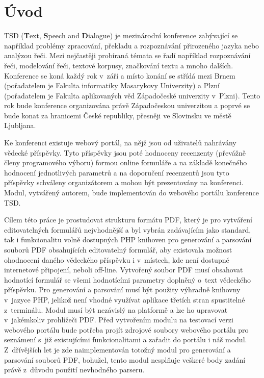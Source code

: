 \chapter{Úvod}
TSD (\textbf{T}ext, \textbf{S}peech and \textbf{D}ialogue) je mezinárodní konference zabývající se například problémy zpracování, překladu a rozpoznávání přirozeného jazyka nebo analýzou řeči. Mezi nejčastěji probíraná témata se řadí například rozpoznávání řeči, modelování řeči, textové korpusy, značkování textu a mnoho dalších. Konference se koná každý rok v~září a místo konání se střídá mezi Brnem (pořadatelem je Fakulta informatiky Masarykovy Univerzity) a Plzní (pořadatelem je Fakulta aplikovaných věd Západočeské univerzity v~Plzni). Tento rok bude konference organizována právě Západočeskou univerzitou a poprvé se bude konat za hranicemi České republiky, přesněji ve Slovinsku ve městě Ljubljana.
\par
Ke konferenci existuje webový portál, na nějž jsou od uživatelů nahrávány vědecké příspěvky. Tyto příspěvky jsou poté hodnoceny recenzenty (převážně členy programového výboru) formou online formuláře a na základě konečného hodnocení jednotlivých parametrů a na doporučení recenzentů jsou tyto příspěvky schváleny organizátorem a mohou být prezentovány na konferenci. Modul, vytvářený autorem, bude implementován do webového portálu konference TSD.
\par
Cílem této práce je prostudovat strukturu formátu PDF, který je pro vytváření editovatelných formulářů nejvhodnější a byl vybrán zadávajícím jako standard, tak i funkcionalitu volně dostupných PHP knihoven pro generování a parsování souborů PDF obsahujících editovatelný formulář, aby existovala možnost ohodnocení daného vědeckého příspěvku i v~místech, kde není dostupné internetové připojení, neboli off-line. Vytvořený soubor PDF musí obsahovat hodnotící formulář se všemi hodnotícími parametry doplněný o~text vědeckého příspěvku. Pro generování a parsování musí být použity výhradně knihovny v~jazyce PHP, jelikož není vhodné využívat aplikace třetích stran spustitelné z~terminálu. Modul musí být nezávislý na platformě a lze ho upravovat v~jakémkoliv prohlížeči PDF. Před vytvořením modulu na testovací verzi webového portálu bude potřeba projít zdrojové soubory webového portálu pro seznámení s~již existujícími funkcionalitami a zařadit do portálu i náš modul. Z~dřívějších let je zde naimplementován totožný modul pro generování a parsování souborů PDF, bohužel, tento modul nesplňuje veškeré body zadání právě z~důvodu použití nevhodného parseru.
 